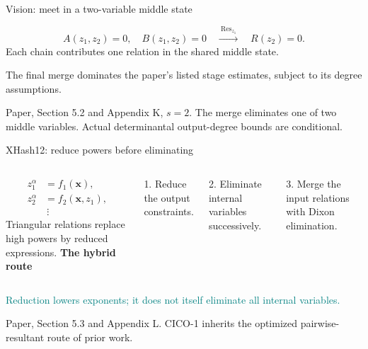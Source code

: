\documentclass[aspectratio=169,11pt,professionalfonts]{beamer}
\newcommand{\src}[1]{\vfill{\color{Muted}\fontsize{7}{8.5}\selectfont #1\par}}
\newcommand{\gap}{\par\vspace{3mm}}
\newcommand{\xx}{\mathbf x}
\begin{document}
\begin{frame}{Vision: meet in a two-variable middle state}
\begin{center}\end{center}\vspace{2mm}
\[A(z_1,z_2)=0,\quad B(z_1,z_2)=0\quad\xrightarrow{\ \operatorname{Res}_{z_1}\ }\quad R(z_2)=0.\]
\vspace{3mm}Each chain contributes one relation in the shared middle state.\gap
The final merge dominates the paper's listed stage estimates, subject to its degree assumptions.
\src{Paper, Section 5.2 and Appendix K, $s=2$. The merge eliminates one of two middle variables. Actual determinantal output-degree bounds are conditional.}
\end{frame}

\begin{frame}{XHash12: reduce powers before eliminating}
\begin{columns}[c,onlytextwidth]
\[\begin{aligned}z_1^\alpha&=f_1(\xx),\\z_2^\alpha&=f_2(\xx,z_1),\\&\ \vdots\end{aligned}\]
Triangular relations replace high powers by reduced expressions.
\textbf{The hybrid route}\gap
1. Reduce the output constraints.\gap
2. Eliminate internal variables successively.\gap
3. Merge the input relations with Dixon elimination.
\end{columns}\vspace{4mm}
\textcolor{Teal}{Reduction lowers exponents; it does not itself eliminate all internal variables.}
\src{Paper, Section 5.3 and Appendix L. CICO-1 inherits the optimized pairwise-resultant route of prior work.}
\end{frame}
\end{document}
